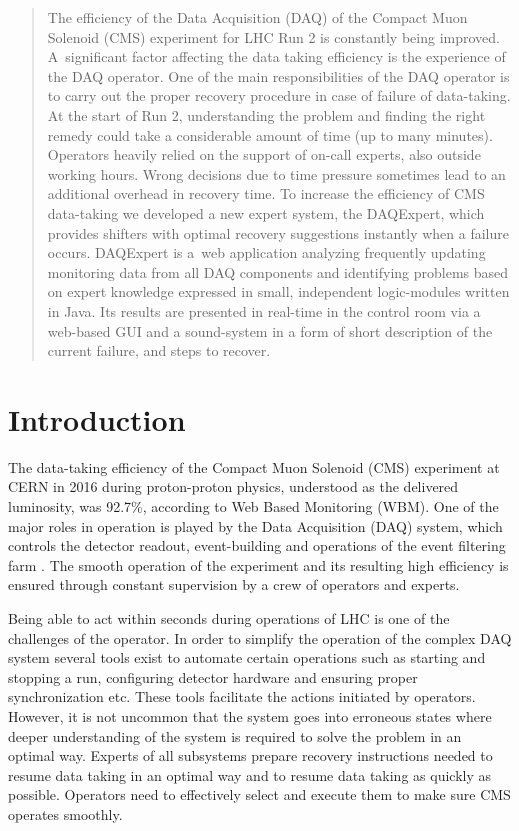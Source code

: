 \documentclass[a4paper]{jpconf}
\begin{document}
\begin{abstract}
The efficiency of the Data Acquisition (DAQ) of the Compact Muon Solenoid (CMS) experiment for LHC Run 2 is constantly being improved. A~significant factor affecting the data taking efficiency is the experience of the DAQ operator. One of the main responsibilities of the DAQ operator is to carry out the proper recovery procedure in case of failure of data-taking. At the start of Run 2, understanding the problem and finding the right remedy could take a considerable amount of time (up to many minutes). Operators heavily relied on the support of on-call experts, also outside working hours. Wrong decisions due to time pressure sometimes lead to an additional overhead in recovery time. To increase the efficiency of CMS data-taking we developed a new expert system, the DAQExpert, which provides shifters with optimal recovery suggestions instantly when a failure occurs. DAQExpert is a~web application analyzing frequently updating monitoring data from all DAQ components and identifying problems based on expert knowledge expressed in small, independent logic-modules written in Java. Its results are presented in real-time in the control room via a web-based GUI and a sound-system in a form of short description of the current failure, and steps to recover.
\end{abstract}

\section{Introduction}
The data-taking efficiency of the Compact Muon Solenoid (CMS) \cite{cms} experiment at CERN in 2016 during proton-proton physics, understood as the delivered luminosity, was 92.7\%, according to Web Based Monitoring (WBM). One of the major roles in operation is played by the Data Acquisition (DAQ) system, which controls the detector readout, event-building and operations of the event filtering farm \cite{daq}. The smooth operation of the experiment and its resulting high efficiency is ensured through constant supervision by a crew of operators and experts.

Being able to act within seconds during operations of LHC is one of the challenges of the operator. In order to simplify the operation of the complex DAQ system several tools exist to automate certain operations such as starting and stopping a run, configuring detector hardware and ensuring proper synchronization etc. These tools facilitate the actions initiated by operators. However, it is not uncommon that the system goes into erroneous states where deeper understanding of the system is required to solve the problem in an optimal way. Experts of all subsystems prepare recovery instructions needed to resume data taking in an optimal way and to resume data taking as quickly as possible. Operators need to effectively select and execute them to make sure CMS operates smoothly.
\end{document}

